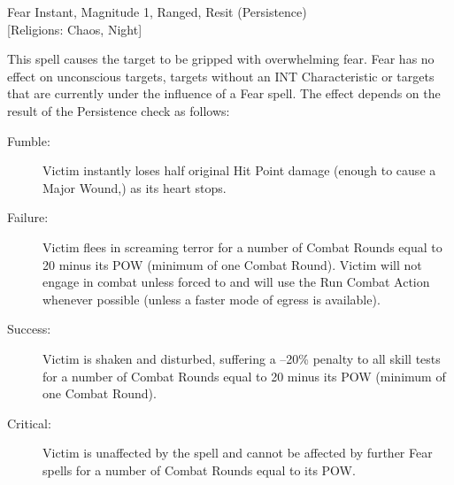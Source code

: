 \begin{rpg-spell}
{Fear}
{Instant, Magnitude 1, Ranged, Resit (Persistence)\\{[Religions: Chaos, Night]}}

This spell causes the target to be gripped with overwhelming fear. Fear has no effect on unconscious targets, targets without an INT Characteristic or targets that are currently under the influence of a Fear spell. The effect depends on the result of the Persistence check as follows:
\begin{description}
\item[Fumble:] Victim instantly loses half original Hit Point damage (enough to cause a Major Wound,) as its heart stops. 
\item[Failure:] Victim flees in screaming terror for a number of Combat Rounds equal to 20 minus its POW (minimum of one Combat Round). Victim will not engage in combat unless forced to and will use the Run Combat Action whenever possible (unless a faster mode of egress is available). 
\item[Success:] Victim is shaken and disturbed, suffering a –20\% penalty to all skill tests for a number of Combat Rounds equal to 20 minus its POW (minimum of one Combat Round).
\item[Critical:] Victim is unaffected by the spell and cannot be affected by further Fear spells for a number of Combat Rounds equal to its POW.
\end{description}
\end{rpg-spell}

